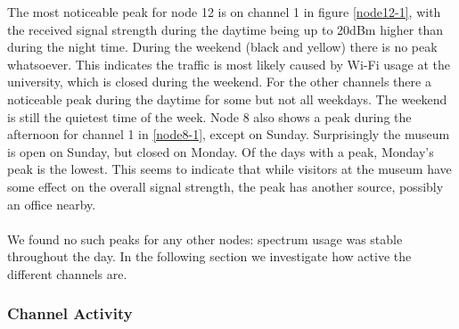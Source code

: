 \documentclass[a4paper, 11pt]{article}
\begin{document}
The most noticeable peak for node 12 is on channel 1 in figure \ref{node12-1}, with the received signal strength during the daytime being up to 20dBm higher than during the night time. During the weekend (black and yellow) there is no peak whatsoever. This indicates the traffic is most likely caused by Wi-Fi usage at the university, which is closed during the weekend. For the other channels there a noticeable peak during the daytime for some but not all weekdays. The weekend is still the quietest time of the week. Node 8 also shows a peak during the afternoon for channel 1 in \ref{node8-1}, except on Sunday. Surprisingly the museum is open on Sunday, but closed on Monday. Of the days with a peak, Monday's peak is the lowest. This seems to indicate that while visitors at the museum have some effect on the overall signal strength, the peak has another source, possibly an office nearby. \\ \\
We found no such peaks for any other nodes: spectrum usage was stable throughout the day. In the following section we investigate how active the different channels are.


\subsubsection{Channel Activity}
\end{document}
